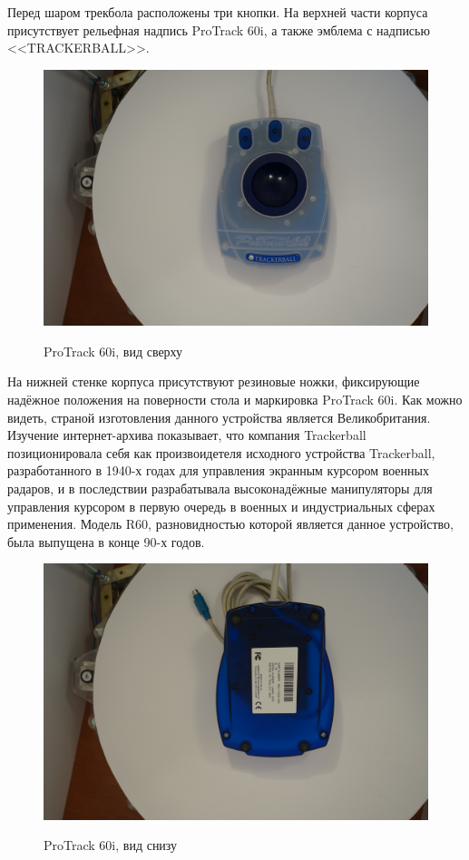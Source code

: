 \documentclass[11pt, a4paper]{article}
\begin{document}
    \newpage
Перед шаром трекбола расположены три кнопки. На верхней части корпуса присутствует рельефная надпись ProTrack 60i, а также эмблема с надписью <<TRACKERBALL>>.
    \begin{figure}[h]
        \centering
    \includegraphics[scale=0.3]{19xx_protrack_60i/monstr3.JPG}
        \label{m4-top}
        \caption{ProTrack 60i, вид сверху}
    \end{figure}
    
На нижней стенке корпуса присутствуют резиновые ножки, фиксирующие надёжное положения на поверности стола и маркировка ProTrack 60i. Как можно видеть, страной изготовления данного устройства является Великобритания.
Изучение интернет-архива показывает, что компания Trackerball позиционировала себя как произвоидетеля исходного устройства Trackerball, разработанного в 1940-х годах для управления экранным курсором военных радаров, и в последствии разрабатывала высоконадёжные манипуляторы для управления курсором в первую очередь в военных и индустриальных сферах применения.  Модель R60, разновидностью которой является данное устройство, была выпущена в конце 90-х годов.

    \begin{figure}[h]
        \centering
    \includegraphics[scale=0.3]{19xx_protrack_60i/monstr4.JPG}
        \label{m4-bottom}
        \caption{ProTrack 60i, вид снизу}
    \end{figure}
    
\end{document}
